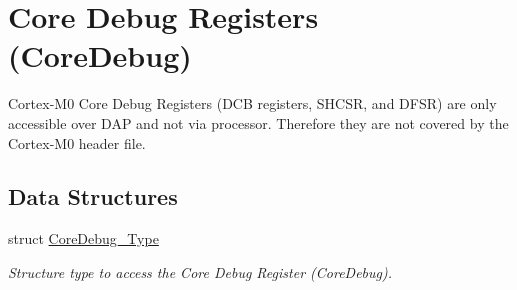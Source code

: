 \hypertarget{group___c_m_s_i_s___core_debug}{}\section{Core Debug Registers (Core\+Debug)}
\label{group___c_m_s_i_s___core_debug}


Cortex-\/\+M0 Core Debug Registers (D\+CB registers, S\+H\+C\+SR, and D\+F\+SR) are only accessible over D\+AP and not via processor. Therefore they are not covered by the Cortex-\/\+M0 header file.  


\subsection*{Data Structures}
\begin{DoxyCompactItemize}
\item 
struct \hyperlink{struct_core_debug___type}{Core\+Debug\+\_\+\+Type}
\begin{DoxyCompactList}\small\item\em Structure type to access the Core Debug Register (Core\+Debug). \end{DoxyCompactList}\end{DoxyCompactItemize}
